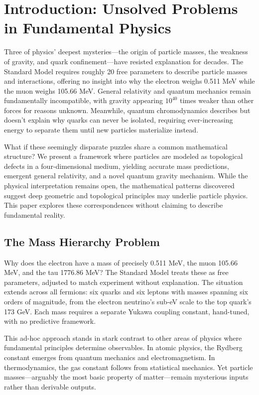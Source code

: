 \section{Introduction: Unsolved Problems in Fundamental Physics}

Three of physics' deepest mysteries---the origin of particle masses, the weakness of gravity, and quark confinement---have resisted explanation for decades. The Standard Model requires roughly 20 free parameters to describe particle masses and interactions, offering no insight into why the electron weighs 0.511 MeV while the muon weighs 105.66 MeV. General relativity and quantum mechanics remain fundamentally incompatible, with gravity appearing $10^{40}$ times weaker than other forces for reasons unknown. Meanwhile, quantum chromodynamics describes but doesn't explain why quarks can never be isolated, requiring ever-increasing energy to separate them until new particles materialize instead.

What if these seemingly disparate puzzles share a common mathematical structure? We present a framework where particles are modeled as topological defects in a four-dimensional medium, yielding accurate mass predictions, emergent general relativity, and a novel quantum gravity mechanism. While the physical interpretation remains open, the mathematical patterns discovered suggest deep geometric and topological principles may underlie particle physics. This paper explores these correspondences without claiming to describe fundamental reality.

\subsection{The Mass Hierarchy Problem}

Why does the electron have a mass of precisely 0.511 MeV, the muon 105.66 MeV, and the tau 1776.86 MeV? The Standard Model treats these as free parameters, adjusted to match experiment without explanation. The situation extends across all fermions: six quarks and six leptons with masses spanning six orders of magnitude, from the electron neutrino's sub-eV scale to the top quark's 173 GeV. Each mass requires a separate Yukawa coupling constant, hand-tuned, with no predictive framework.

This ad-hoc approach stands in stark contrast to other areas of physics where fundamental principles determine observables. In atomic physics, the Rydberg constant emerges from quantum mechanics and electromagnetism. In thermodynamics, the gas constant follows from statistical mechanics. Yet particle masses---arguably the most basic property of matter---remain mysterious inputs rather than derivable outputs.


